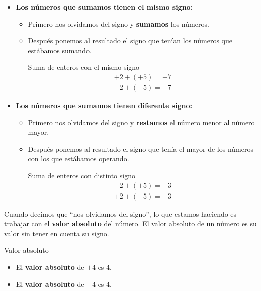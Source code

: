 \begin{itemize}
    \item \textbf{Los números que sumamos tienen el mismo signo:}
    \begin{itemize}
        \item Primero nos olvidamos del signo y \textbf{sumamos} los números.
        \item Después ponemos al resultado el signo que tenían los números que estábamos sumando.
        \begin{ejemplos}[label={Ejemplo:sumaEnterosMismoSigno}]{Suma de enteros con el mismo signo}
            \begin{gather}
                +2 + (+5) = +7 \nonumber \\
                -2 + (-5) = -7 \nonumber
            \end{gather}
        \end{ejemplos}
    \end{itemize}
    \item \textbf{Los números que sumamos tienen diferente signo:}
    \begin{itemize}
        \item Primero nos olvidamos del signo y \textbf{restamos} el número menor al número mayor.
        \item Después ponemos al resultado el signo que tenía el mayor de los números con los que estábamos operando.
        \begin{ejemplos}[label={Ejemplo:sumaEnterosDistintoSigno}]{Suma de enteros con distinto signo}
            \begin{gather}
                -2 + (+5) = +3 \nonumber \\
                +2 + (-5) = -3 \nonumber
            \end{gather}
        \end{ejemplos}
    \end{itemize}
\end{itemize}

Cuando decimos que ``nos olvidamos del signo'', lo que estamos haciendo es trabajar con el \textbf{valor absoluto} del número. El valor absoluto de un número es su valor sin tener en cuenta su signo.

\begin{ejemplos}[label={Ejemplo:valorAbsoluto}]{Valor absoluto}
    \begin{itemize}
        \item El \textbf{valor absoluto} de $+4$ es $4$.
        \item El \textbf{valor absoluto} de $-4$ es $4$.
    \end{itemize}
\end{ejemplos}

